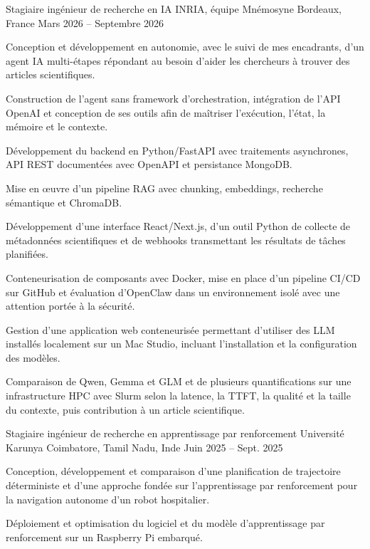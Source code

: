 
\begin{cventries}
  \cventry
    {Stagiaire ingénieur de recherche en IA}
    {INRIA, équipe Mnémosyne}
    {Bordeaux, France}
    {Mars 2026 -- Septembre 2026}
    {
      \begin{cvitems}
        \item {Conception et développement en autonomie, avec le suivi de mes encadrants, d’un agent IA multi-étapes répondant au besoin d’aider les chercheurs à trouver des articles scientifiques.}
        \item {Construction de l’agent sans framework d’orchestration, intégration de l’API OpenAI et conception de ses outils afin de maîtriser l’exécution, l’état, la mémoire et le contexte.}
        \item {Développement du backend en Python/FastAPI avec traitements asynchrones, API REST documentées avec OpenAPI et persistance MongoDB.}
        \item {Mise en œuvre d’un pipeline RAG avec chunking, embeddings, recherche sémantique et ChromaDB.}
        \item {Développement d’une interface React/Next.js, d’un outil Python de collecte de métadonnées scientifiques et de webhooks transmettant les résultats de tâches planifiées.}
        \item {Conteneurisation de composants avec Docker, mise en place d’un pipeline CI/CD sur GitHub et évaluation d’OpenClaw dans un environnement isolé avec une attention portée à la sécurité.}
        \item {Gestion d’une application web conteneurisée permettant d’utiliser des LLM installés localement sur un Mac Studio, incluant l’installation et la configuration des modèles.}
        \item {Comparaison de Qwen, Gemma et GLM et de plusieurs quantifications sur une infrastructure HPC avec Slurm selon la latence, la TTFT, la qualité et la taille du contexte, puis contribution à un article scientifique.}
      \end{cvitems}
    }

  \cventry
    {Stagiaire ingénieur de recherche en apprentissage par renforcement}
    {Université Karunya}
    {Coimbatore, Tamil Nadu, Inde}
    {Juin 2025 -- Sept. 2025}
    {
      \begin{cvitems}
        \item {Conception, développement et comparaison d’une planification de trajectoire déterministe et d’une approche fondée sur l’apprentissage par renforcement pour la navigation autonome d’un robot hospitalier.}
        \item {Déploiement et optimisation du logiciel et du modèle d’apprentissage par renforcement sur un Raspberry Pi embarqué.}
      \end{cvitems}
    }
\end{cventries}
